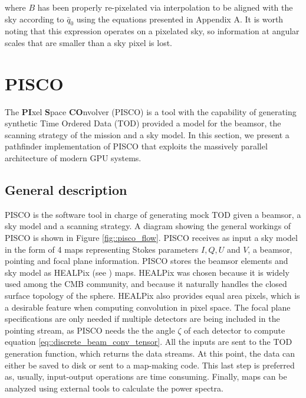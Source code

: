 \documentclass[a4paper,11pt]{article}
\begin{document}
\noindent
where $B$ has been properly re-pixelated via interpolation to be aligned with the sky according to $\bar{q}_0$ using the equations presented in Appendix A. It is worth noting that this expression operates on a pixelated sky, so information at angular scales that are smaller than a sky pixel is lost.

\section{PISCO}
\label{sec::pisco}

The \textbf{PI}xel \textbf{S}pace \textbf{CO}nvolver (PISCO) is a tool with the capability of generating synthetic Time Ordered Data (TOD) provided a model for the beamsor, the scanning strategy of the mission and a sky model. In this section, we present a pathfinder implementation of PISCO that exploits the massively parallel architecture of modern GPU systems.

\subsection{General description}

PISCO is the software tool in charge of generating mock TOD given a beamsor, a sky model and a scanning strategy. A diagram showing the general workings of PISCO is shown in Figure \ref{fig::pisco_flow}. PISCO receives as input a sky model in the form of 4 maps representing Stokes parameters $I,Q,U$ and $V$, a beamsor, pointing and focal plane information. PISCO stores the beamsor elements and sky model as HEALPix (see \cite{2005ApJ...622..759G}) maps. HEALPix was chosen because it is widely used among the CMB community, and because it naturally handles the closed surface topology of the sphere. HEALPix also provides equal area pixels, which is a desirable feature when computing convolution in pixel space. The focal plane specifications are only needed if multiple detectors are being included in the pointing stream, as PISCO needs the the angle $\zeta$ of each detector to compute equation \ref{eq::discrete_beam_conv_tensor}. All the inputs are sent to the TOD generation function, which returns the data streams. At this point, the data can either be saved to disk or sent to a map-making code. This last step is preferred as, usually, input-output operations are time consuming. Finally, maps can be analyzed using external tools to calculate the power spectra.
\end{document}
